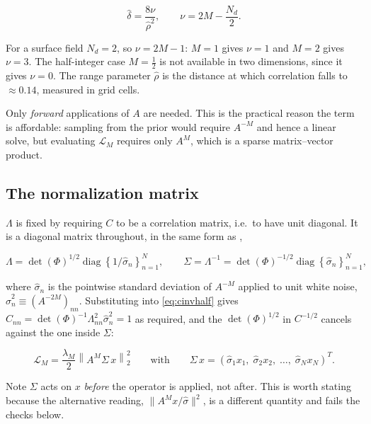 \documentclass[11pt]{article}
\newcommand{\dhat}{\hat{\delta}}
\newcommand{\rhohat}{\hat{\rho}}
\newcommand{\shat}{\hat{\sigma}}
\newcommand{\Nd}{N_d}
\begin{document}
\begin{equation}
\label{eq:calib}
\dhat = \frac{8\nu}{\rhohat^{2}},
\qquad
\nu = 2M - \frac{\Nd}{2}.
\end{equation}

For a surface field $\Nd = 2$, so $\nu = 2M-1$: $M=1$ gives $\nu=1$ and $M=2$ gives
$\nu=3$. The half-integer case $M=\tfrac12$ is not available in two dimensions, since it
gives $\nu=0$. The range parameter $\rhohat$ is the distance at which correlation falls to
$\approx 0.14$, measured in grid cells.

Only \emph{forward} applications of $A$ are needed. This is the practical reason the term
is affordable: sampling from the prior would require $A^{-M}$ and hence a linear solve,
but evaluating $\mathcal{L}_M$ requires only $A^{M}$, which is a sparse matrix--vector
product.

\subsection{The normalization matrix}
\label{sec:lambda}

$\Lambda$ is fixed by requiring $C$ to be a correlation matrix, i.e.\ to have unit
diagonal. It is a diagonal matrix throughout, in the same form as \citet{smith2022},

\begin{equation}
\label{eq:lambda}
\Lambda = \det(\Phi)^{1/2}\operatorname{diag}\left\{1/\shat_n\right\}_{n=1}^{N},
\qquad
\Sigma = \Lambda^{-1} = \det(\Phi)^{-1/2}\operatorname{diag}\left\{\shat_n\right\}_{n=1}^{N},
\end{equation}

\noindent where $\shat_n$ is the pointwise standard deviation of $A^{-M}$ applied to unit
white noise, $\shat_n^2 \equiv (A^{-2M})_{nn}$. Substituting into \eqref{eq:cinvhalf} gives
$C_{nn} = \det(\Phi)^{-1}\Lambda_{nn}^2\shat_n^2 = 1$ as required, and the
$\det(\Phi)^{1/2}$ in $C^{-1/2}$ cancels against the one inside $\Sigma$:

\begin{equation}
\label{eq:LM}
\mathcal{L}_M = \frac{\lambda_M}{2}\left\|A^{M}\Sigma\, x\right\|_2^2
\qquad\text{with}\qquad
\Sigma \, x = \left(\shat_1 x_1, \; \shat_2 x_2, \; \ldots, \; \shat_N x_N\right)^{T}.
\end{equation}

Note $\Sigma$ acts on $x$ \emph{before} the operator is applied, not after. This is worth
stating because the alternative reading, $\|A^M x / \shat\|^2$, is a different quantity
and fails the checks below.
\end{document}
